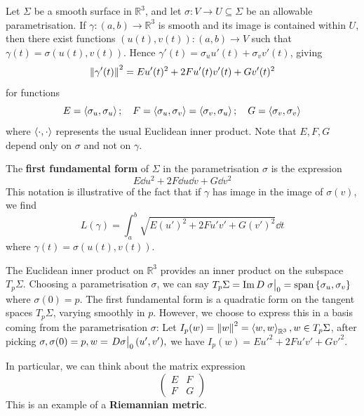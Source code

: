 \documentclass[a4paper,11pt]{article}
\begin{document}
Let \( \Sigma \) be a smooth surface in \( \mathbb R^3 \), and let \( \sigma \colon V \to U \subseteq \Sigma \) be an allowable parametrisation.
If \( \gamma \colon (a,b) \to \mathbb R^3 \) is smooth and its image is contained within \( U \), then there exist functions \( (u(t), v(t)) \colon (a,b) \to V \) such that \( \gamma(t) = \sigma(u(t), v(t)) \).
Hence \( \gamma'(t) = \sigma_u u'(t) + \sigma_v v'(t) \), giving
\[
	\norm{\gamma'(t)}^2 = E u'(t)^2 + 2F u'(t) v'(t) + G v'(t)^2
\]
for functions
\[
	E = \left\langle{\sigma_u, \sigma_u}\right\rangle;\quad F = \left\langle{\sigma_u, \sigma_v}\right\rangle = \left\langle{\sigma_v, \sigma_u}\right\rangle;\quad G = \left\langle{\sigma_v, \sigma_v}\right\rangle
\]
where \( \left\langle{\cdot,\cdot}\right\rangle \) represents the usual Euclidean inner product.
Note that \( E, F, G \) depend only on \( \sigma \) and not on \( \gamma \).
\begin{definition}
	The \textbf{first fundamental form} of \( \Sigma \) in the parametrisation \( \sigma \) is the expression
	\[
		E \dd{u}^2 + 2F \dd{u} \dd{v} + G \dd{v}^2
	\]
	This notation is illustrative of the fact that if \( \gamma \) has image in the image of \( \sigma(v) \), we find
	\[
		L(\gamma) = \int_a^b \sqrt{E (u')^2 + 2F u'v' + G (v')^2} \dd{t}
	\]
	where \( \gamma(t) = \sigma(u(t),v(t)) \).
\end{definition}
\begin{remark}
	The Euclidean inner product on \( \mathbb R^3 \) provides an inner product on the subspace \( T_p \Sigma \).
	Choosing a parametrisation \( \sigma \), we can say \( T_p \Sigma = \Im D \eval{\sigma}_0 = \spn{\qty{\sigma_u, \sigma_v}} \) where \( \sigma(0) = p \).
	The first fundamental form is a quadratic form on the tangent spaces \( T_p \Sigma \), varying smoothly in \( p \).
	However, we choose to express this in a basis coming from the parametrisation \( \sigma \): Let $ I_p(w) = \norm{w}^2 = \left\langle{w,w}\right\rangle_{\mathbb{R}^3}, w\in T_p\Sigma $, after picking $ \sigma, \sigma(0) = p, w = \eval{D\sigma}_0(u',v' ), $ we have $ I_p(w) = E u'^2 + 2F u'v' + G v'^2 $. 

	In particular, we can think about the matrix expression
	\[
		\begin{pmatrix}
			E & F \\
			F & G
		\end{pmatrix}
	\]
	This is an example of a \textbf{Riemannian metric}. 
\end{remark}
\end{document}
